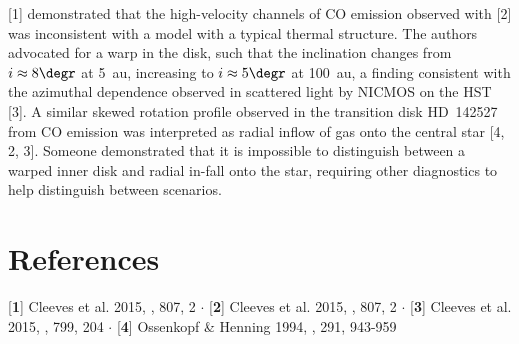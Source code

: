 \documentclass[11pt]{article}
\begin{document}
[1] demonstrated that the high-velocity channels of CO
emission observed with [2] was inconsistent with a model
with a typical thermal structure. The authors advocated for a warp in the disk,
such that the inclination changes from $i \approx 8\degr$ at 5~au, increasing
to $i \approx 5\degr$ at 100~au, a finding consistent with the azimuthal
dependence observed in scattered light by NICMOS on the \gls{HST}
[3]. A similar skewed rotation profile observed in the
transition disk HD~142527 from CO emission was interpreted as radial inflow of
gas onto the central star [4, 2, 3]. Someone demonstrated that it is impossible to distinguish
between a warped inner disk and radial in-fall onto the star, requiring other
diagnostics to help distinguish between scenarios.

\section*{References}
\footnotesize
[\textbf{1}] Cleeves et al. 2015, \apj, 807, 2 $\cdot$ [\textbf{2}] Cleeves et al. 2015, \apj, 807, 2 $\cdot$ [\textbf{3}] Cleeves et al. 2015, \apj, 799, 204 $\cdot$ [\textbf{4}] Ossenkopf \& Henning 1994, \aap, 291, 943-959
\end{document}
